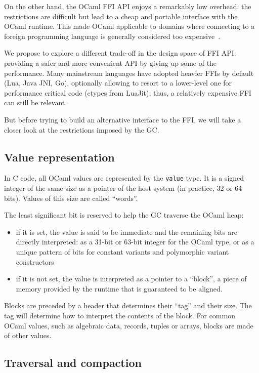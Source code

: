 \documentclass[a4paper]{easychair}
\newcommand{\caml}[1]{\smash{\lstinline{#1}}}
\newcommand{\cpp}[1]{\lstinline[style=C++]{#1}}
\begin{document}
On the other hand, the OCaml FFI API enjoys a remarkably low overhead:
the restrictions are difficult but lead to a cheap and portable
interface with the OCaml runtime. This made OCaml applicable to domains
where connecting to a foreign programming language is generally
considered too expensive~\citep{bourke:hal-01408230}.

We propose to explore a different trade-off in the design space of FFI
API: providing a safer and more convenient API by giving up some of the
performance.  Many mainstream languages have adopted heavier FFIs by default
(Lua, Java JNI, Go), optionally allowing to resort to a lower-level one
for performance critical code (ctypes from LuaJit); thus, a relatively
expensive FFI can still be relevant.

But before trying to build an alternative interface to the FFI, we will take a
closer look at the restrictions imposed by the GC.

\subsection{Value representation}

In C code, all OCaml values are represented by the \cpp{value} type. It is a
signed integer of the same size as a pointer of the host system (in practice,
32 or 64 bits). Values of this size are called ``words''.

The least significant bit is reserved to help the GC traverse the OCaml
heap:
%
\begin{itemize}
\item if it is set, the value is said to be immediate and the remaining bits
      are directly interpreted: as a 31-bit or 63-bit integer for the
      \caml{int} OCaml type, or as a unique pattern of bits for constant
      variants and polymorphic variant constructors
\item if it is not set, the value is interpreted as a pointer to a
      ``block'', a piece of memory provided by the runtime that is guaranteed
      to be aligned.
\end{itemize}

Blocks are preceded by a header that determines their ``tag'' and their
size. The tag will determine how to interpret the contents of the block.
For common OCaml values, such as algebraic data, records, tuples or
arrays, blocks are made of other values.

\subsection{Traversal and compaction}
\end{document}
